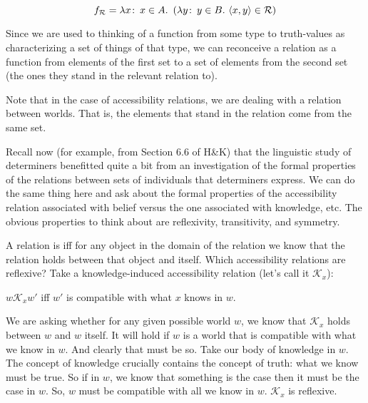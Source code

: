 \[f_{\mathcal{R}} = \lambda x\co x\in A.\ \left( \lambda y\co y\in B.\ \pair{x,y}\in
\mathcal{R}\right)\]

Since we are used to thinking of a function from some type to truth-values as
characterizing a set of things of that type, we can reconceive a relation as a
function from elements of the first set to a set of elements from the second set
(the ones they stand in the relevant relation to).

%
Note that in the case of accessibility relations, we are dealing with a relation
between worlds. That is, the elements that stand in the relation come from the
same set. 

%
Recall now (for example, from Section 6.6 of H\&K) that the linguistic study of
determiners benefitted quite a bit from an investigation of the formal
properties of the relations between sets of individuals that determiners
express. We can do the same thing here and ask about the formal properties of
the accessibility relation associated with belief versus the one associated with
knowledge, etc. The obvious properties to think about are reflexivity,
transitivity, and symmetry.

A relation is  iff for any object in the domain of the relation
we know that the relation holds between that object and itself. Which
accessibility relations are reflexive? Take a knowledge-induced accessibility
relation (let's call it $\mathcal{K}_{x}$):

\ex $w\mathcal{K}_{x}w'$ iff $w'$ is compatible with what $x$
knows in $w$. \xe

%
We are asking whether for any given possible world $w$, we know that
$\mathcal{K}_{x}$ holds between $w$ and $w$ itself. It will hold
if $w$ is a world that is compatible with what we know in $w$. And clearly that
must be so. Take our body of knowledge in $w$. The concept of knowledge
crucially contains the concept of truth: what we know must be true. So if in
$w$, we know that something is the case then it must be the case in $w$. So, $w$
must be compatible with all we know in $w$. $\mathcal{K}_{x}$ is
reflexive.


